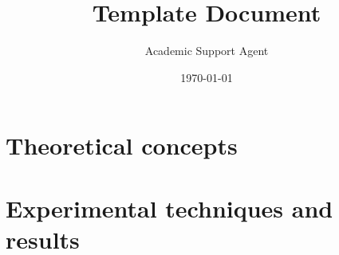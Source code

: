 \documentclass{article}
\title{Template Document}
\author{Academic Support Agent}
\date{\today}
\begin{document}
\maketitle

\prefrontmatter

\cleartoevenpage

\clearforchapter







\clearforchapter
{} %

\clearforchapter


\part{Theoretical concepts}

\part{Experimental techniques and results}




\pagestyle{appruled} %




\pagestyle{myruled} %
\end{document}
